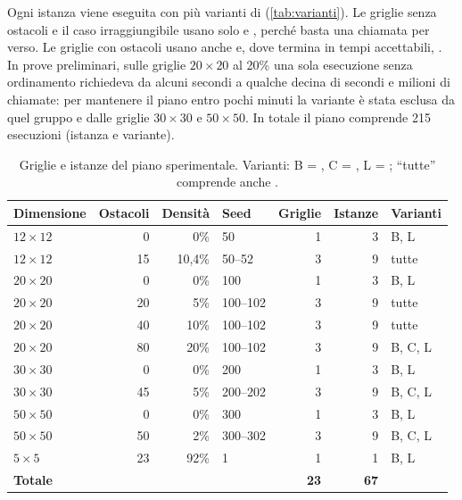 Ogni istanza viene eseguita con più varianti di \cmin{}
(\cref{tab:varianti}). Le griglie senza ostacoli e il caso irraggiungibile
usano solo  e , perché basta una chiamata
per verso. Le griglie con ostacoli usano anche  e, dove
termina in tempi accettabili, . In prove
preliminari, sulle griglie $20\times20$ al 20\% una sola esecuzione senza
ordinamento richiedeva da alcuni secondi a qualche decina di secondi e
milioni di chiamate: per
mantenere il piano entro pochi minuti la variante è stata esclusa da quel
gruppo e dalle griglie $30\times30$ e $50\times50$. In totale il piano
comprende 215 esecuzioni (istanza e variante).

\begin{table}[H]
\centering
\small
\begin{tabular}{@{}l r r l r r l@{}}
\toprule
\textbf{Dimensione} & \textbf{Ostacoli} & \textbf{Densità} & \textbf{Seed} & \textbf{Griglie} & \textbf{Istanze} & \textbf{Varianti} \\
\midrule
$12\times12$ & 0  & 0\%    & 50        & 1 & 3 & B, L \\
$12\times12$ & 15 & 10,4\% & 50--52    & 3 & 9 & tutte \\
$20\times20$ & 0  & 0\%    & 100       & 1 & 3 & B, L \\
$20\times20$ & 20 & 5\%    & 100--102  & 3 & 9 & tutte \\
$20\times20$ & 40 & 10\%   & 100--102  & 3 & 9 & tutte \\
$20\times20$ & 80 & 20\%   & 100--102  & 3 & 9 & B, C, L \\
$30\times30$ & 0  & 0\%    & 200       & 1 & 3 & B, L \\
$30\times30$ & 45 & 5\%    & 200--202  & 3 & 9 & B, C, L \\
$50\times50$ & 0  & 0\%    & 300       & 1 & 3 & B, L \\
$50\times50$ & 50 & 2\%    & 300--302  & 3 & 9 & B, C, L \\
$5\times5$   & 23 & 92\%   & 1         & 1 & 1 & B, L \\
\midrule
\textbf{Totale} & & & & \textbf{23} & \textbf{67} & \\
\bottomrule
\end{tabular}
\caption{Griglie e istanze del piano sperimentale. Varianti: B = ,
C = , L = ; ``tutte'' comprende
anche .}
\label{tab:piano}
\end{table}


